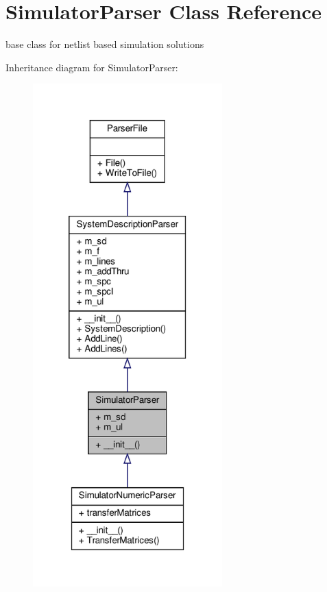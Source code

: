\hypertarget{classSignalIntegrity_1_1Parsers_1_1SimulatorParser_1_1SimulatorParser}{}\section{Simulator\+Parser Class Reference}
\label{classSignalIntegrity_1_1Parsers_1_1SimulatorParser_1_1SimulatorParser}


base class for netlist based simulation solutions  




Inheritance diagram for Simulator\+Parser\+:\nopagebreak
\begin{figure}[H]
\begin{center}
\leavevmode
\includegraphics[height=550pt]{classSignalIntegrity_1_1Parsers_1_1SimulatorParser_1_1SimulatorParser__inherit__graph}
\end{center}
\end{figure}


